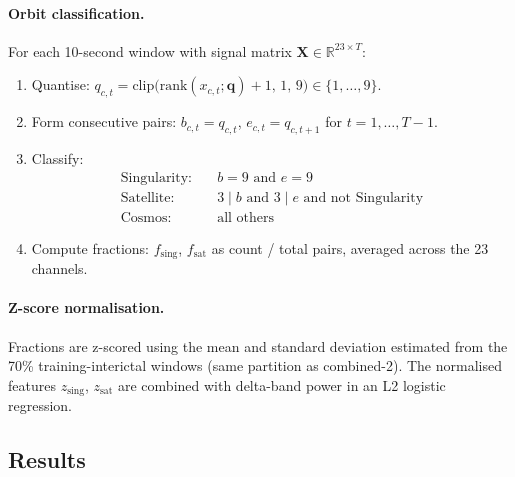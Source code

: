 \documentclass[11pt]{article}
\begin{document}
\paragraph{Orbit classification.}
For each 10-second window with signal matrix $\mathbf{X} \in \mathbb{R}^{23 \times T}$:
\begin{enumerate}[nosep]
  \item Quantise: $q_{c,t} = \mathrm{clip}\bigl(\mathrm{rank}(x_{c,t}; \mathbf{q})+1,\, 1,\, 9\bigr) \in \{1,\ldots,9\}$.
  \item Form consecutive pairs: $b_{c,t} = q_{c,t}$, $e_{c,t} = q_{c,t+1}$ for $t = 1,\ldots,T-1$.
  \item Classify:
  \begin{align*}
    \text{Singularity:}&\quad b = 9 \text{ and } e = 9\\
    \text{Satellite:}&\quad 3 \mid b \text{ and } 3 \mid e \text{ and not Singularity}\\
    \text{Cosmos:}&\quad \text{all others}
  \end{align*}
  \item Compute fractions: $f_\mathrm{sing}$, $f_\mathrm{sat}$ as count / total pairs,
        averaged across the 23 channels.
\end{enumerate}

\paragraph{Z-score normalisation.}
Fractions are z-scored using the mean and standard deviation estimated
from the 70\% training-interictal windows (same partition as combined-2).
The normalised features $z_\mathrm{sing}$, $z_\mathrm{sat}$ are combined
with delta-band power in an L2 logistic regression.

\subsection*{Results}
\end{document}

